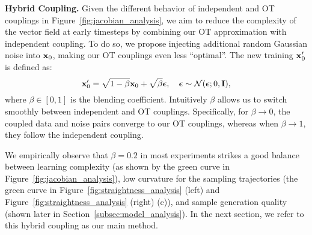 \textbf{Hybrid Coupling.} %
%
Given the different behavior of independent and OT couplings in Figure~\ref{fig:jacobian_analysis}, we aim to reduce the complexity of the vector field at early timesteps by combining our OT approximation with independent coupling.
%
To do so, we propose injecting additional random Gaussian noise into ${\mathbf{x}}_0$, making our OT couplings even less ``optimal''.
%
The new training ${\mathbf{x}}_0'$ is defined as:
\begin{equation}
    {\mathbf{x}}_0' = \sqrt{1 - \beta} {\mathbf{x}}_0 +  \sqrt{\beta} {\bm{\epsilon}}, \quad {\bm{\epsilon}} \sim \mathcal{N}({\bm{\epsilon}}; 0, \textbf{I}),
\end{equation}
where $\beta \in [0, 1]$ is the blending coefficient.
%
%
Intuitively $\beta$ allows us to switch smoothly between independent and OT couplings.
Specifically, for $\beta \rightarrow 0$, the coupled data and noise pairs converge to our OT couplings, whereas when $\beta \rightarrow 1$, they follow the independent coupling.
%
%

We empirically observe that $\beta = 0.2$ in most experiments strikes a good balance between learning complexity (as shown by the green curve in Figure~\ref{fig:jacobian_analysis}), low curvature for the sampling trajectories (the green curve in Figure~\ref{fig:straightness_analysis} (left) and Figure~\ref{fig:straightness_analysis} (right) (c)), and sample generation quality (shown later in Section~\ref{subsec:model_analysis}). In the next section, we refer to this hybrid coupling as our main method. 

